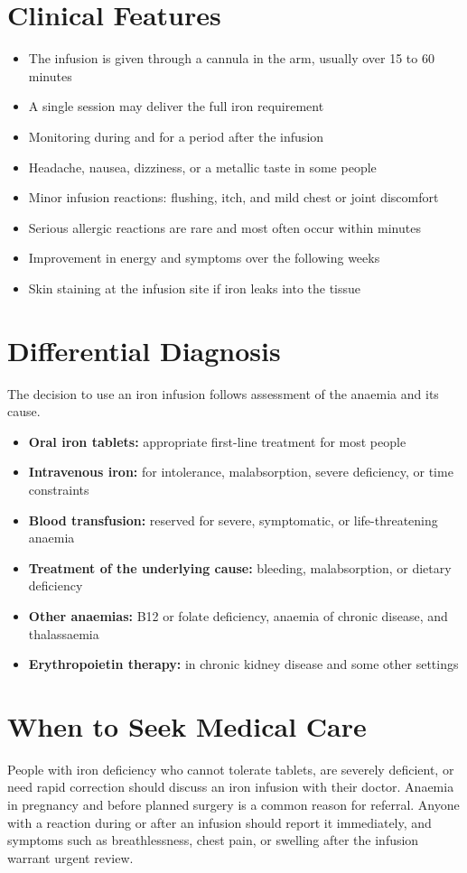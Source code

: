 \section*{Clinical Features}
\begin{itemize}
    \item The infusion is given through a cannula in the arm, usually over 15 to 60 minutes
    \item A single session may deliver the full iron requirement
    \item Monitoring during and for a period after the infusion
    \item Headache, nausea, dizziness, or a metallic taste in some people
    \item Minor infusion reactions: flushing, itch, and mild chest or joint discomfort
    \item Serious allergic reactions are rare and most often occur within minutes
    \item Improvement in energy and symptoms over the following weeks
    \item Skin staining at the infusion site if iron leaks into the tissue
\end{itemize}

\section*{Differential Diagnosis}
The decision to use an iron infusion follows assessment of the anaemia and its cause.
\begin{itemize}
    \item \textbf{Oral iron tablets:} appropriate first-line treatment for most people
    \item \textbf{Intravenous iron:} for intolerance, malabsorption, severe deficiency, or time constraints
    \item \textbf{Blood transfusion:} reserved for severe, symptomatic, or life-threatening anaemia
    \item \textbf{Treatment of the underlying cause:} bleeding, malabsorption, or dietary deficiency
    \item \textbf{Other anaemias:} B12 or folate deficiency, anaemia of chronic disease, and thalassaemia
    \item \textbf{Erythropoietin therapy:} in chronic kidney disease and some other settings
\end{itemize}

\section*{When to Seek Medical Care}
People with iron deficiency who cannot tolerate tablets, are severely deficient, or need rapid correction should discuss an iron infusion with their doctor. Anaemia in pregnancy and before planned surgery is a common reason for referral. Anyone with a reaction during or after an infusion should report it immediately, and symptoms such as breathlessness, chest pain, or swelling after the infusion warrant urgent review.

